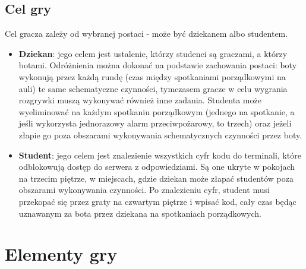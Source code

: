 \documentclass[]{report}
\begin{document}
\subsection{Cel gry}
Cel gracza zależy od wybranej postaci - może być dziekanem albo studentem.
\begin{itemize}
	\item \textbf{Dziekan}: jego celem jest ustalenie, którzy studenci są graczami, a którzy botami. Odróżnienia można dokonać na podstawie zachowania postaci: boty wykonują przez każdą rundę (czas między spotkaniami porządkowymi na auli) te same schematyczne czynności, tymczasem gracze w celu wygrania rozgrywki muszą wykonywać również inne zadania. Studenta może wyeliminować na każdym spotkaniu porządkowym (jednego na spotkanie, a jeśli wykorzysta jednorazowy alarm przeciwpożarowy, to trzech) oraz jeżeli złapie go poza obszarami wykonywania schematycznych czynności przez boty.
	\item \textbf{Student}: jego celem jest znalezienie wszystkich cyfr kodu do terminali, które odblokowują dostęp do serwera z odpowiedziami. Są one ukryte w pokojach na trzecim piętrze, w miejscach, gdzie dziekan może złapać studentów poza obszarami wykonywania czynności. Po znalezieniu cyfr, student musi przekopać się przez graty na czwartym piętrze i wpisać kod, cały czas będąc uznawanym za bota przez dziekana na spotkaniach porządkowych.
\end{itemize}

\section{Elementy gry}
\end{document}
